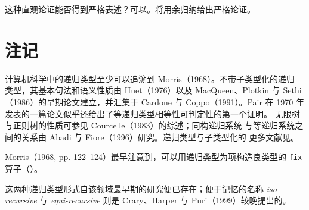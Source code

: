 
这种直观论证能否得到严格表述？可以。将用余归纳给出严格论证。

\section{注记}
\label{sec:20.4}

计算机科学中的递归类型至少可以追溯到 Morris（1968）。不带子类型化的递归
类型，其基本句法和语义性质由 Huet（1976）以及 MacQueen、Plotkin 与
Sethi（1986）的早期论文建立，并汇集于 Cardone 与 Coppo（1991）。Pair
在 1970 年发表的一篇论文似乎还给出了等递归类型相等性可判定性的第一个证明。
无限树与正则树的性质可参见 Courcelle（1983）的综述；同构递归系统
与等递归系统之间的关系由 Abadi 与 Fiore（1996）研究。递归类型与子类型化的
更多文献见。

Morris（1968, pp. 122--124）最早注意到，可以用递归类型为项构造良类型的
\texttt{fix} 算子（）。

这两种递归类型形式自该领域最早期的研究便已存在；便于记忆的名称
\emph{iso-recursive} 与 \emph{equi-recursive} 则是 Crary、Harper 与
Puri（1999）较晚提出的。
